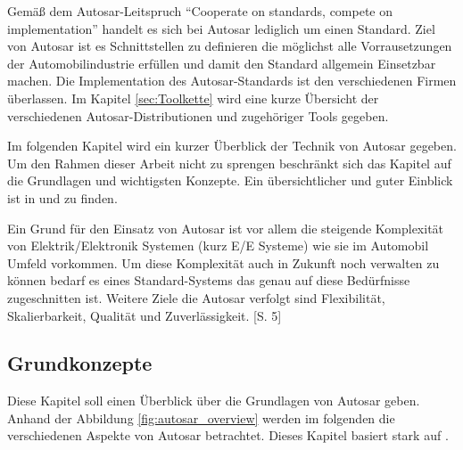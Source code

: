 \documentclass[
  a4paper,					    %
  twoside,
  DIV=calc,     				%
  bibliography=totoc,
  cleardoublepage=empty,
  ngerman,     					%
  final       					%
]{scrbook}
\begin{document}
Gemäß dem Autosar-Leitspruch "`Cooperate on standards, compete on implementation"' handelt es sich bei Autosar lediglich um einen Standard. Ziel von Autosar ist es Schnittstellen zu definieren die möglichst alle Vorrausetzungen der Automobilindustrie erfüllen und damit den Standard allgemein Einsetzbar machen. Die Implementation des Autosar-Standards ist den verschiedenen Firmen überlassen. Im Kapitel \ref{sec:Toolkette} wird eine kurze Übersicht der verschiedenen Autosar-Distributionen und zugehöriger Tools gegeben.

Im folgenden Kapitel wird ein kurzer Überblick der Technik von Autosar gegeben. Um den Rahmen dieser Arbeit nicht zu sprengen beschränkt sich das Kapitel auf die Grundlagen und wichtigsten Konzepte. Ein übersichtlicher und guter Einblick ist in \cite{autosar_techoverview} und \cite{autosar_layer} zu finden.

Ein Grund für den Einsatz von Autosar ist vor allem die steigende Komplexität von Elektrik/Elektronik Systemen (kurz E/E Systeme) wie sie im Automobil Umfeld vorkommen. Um diese Komplexität auch in Zukunft noch verwalten zu können bedarf es eines Standard-Systems das genau auf diese Bedürfnisse zugeschnitten ist. Weitere Ziele die Autosar verfolgt sind Flexibilität, Skalierbarkeit, Qualität und Zuverlässigkeit. \cite{autosar_techoverview}[S. 5]



\subsection{Grundkonzepte}
\label{sec:Grundkonzepte}
Diese Kapitel soll einen Überblick über die Grundlagen von Autosar geben. Anhand der Abbildung \ref{fig:autosar_overview} werden im folgenden die verschiedenen Aspekte von Autosar betrachtet. Dieses Kapitel basiert stark auf \cite{autosar_techoverview}.
\end{document}
